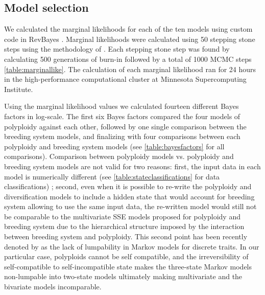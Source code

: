\subsection{Model selection}

We calculated the marginal likelihoods  for each of the ten models using custom code in RevBayes \citet{hoehna_2016}.  Marginal likelihoods were calculated using 50  stepping stone steps using the methodology of \citet{xie_2010}. Each stepping stone step was found by calculating 500 generations of burn-in followed by a total of 1000 MCMC steps \cref{table:marginallike}.  The calculation of each marginal likelihood ran for 24 hours in the high-performance computational cluster at Minnesota Supercomputing Institute.\newline

Using the marginal likelihood values we calculated fourteen different Bayes factors in log-scale. The first six Bayes factors compared the four models of polyploidy against each other, followed by one single comparison between the breeding system models, and finalizing with four comparisons between each polyploidy and breeding system models (see \cref{table:bayesfactors} for all comparisons). Comparison between polyploidy models vs. polyploidy and breeding system models are not valid for two reasons: first, the input data in each model is numerically different (see \cref{table:stateclassifications} for data classifications)
; second, even when it is possible to re-write the polyploidy and diversification models to include a hidden state that would account for breeding system allowing to use the same input data, the re-written model would still not be comparable to the multivariate SSE models proposed for polyploidy and breeding system due to the hierarchical structure imposed by the interaction between breeding system and polyploidy. This second point has been recently denoted by \citet{tarasov_2019} as the lack of lumpability in Markov models for discrete traits.  In our particular case, polyploids cannot be self compatible, and the irreversibility of self-compatible to self-incompatible state makes the three-state Markov models non-lumpable into two-state models ultimately making  multivariate and the bivariate models incomparable.


